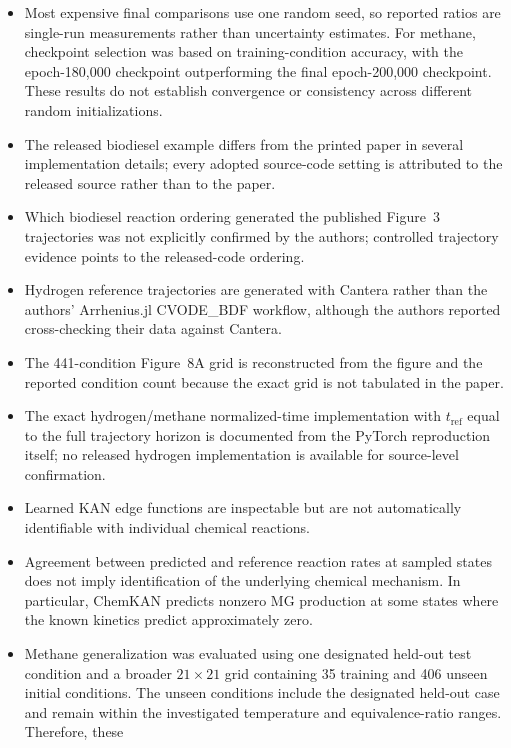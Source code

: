 \documentclass[11pt,a4paper]{article}
\begin{document}
\begin{itemize}
    \item Most expensive final comparisons use one random seed, so reported ratios are single-run measurements rather than uncertainty estimates. For methane, checkpoint selection was based on training-condition accuracy, with the epoch-180,000 checkpoint outperforming the final epoch-200,000 checkpoint. These results do not establish convergence or consistency across different random initializations.
    \item The released biodiesel example differs from the printed paper in several implementation details; every adopted source-code setting is attributed to the released source rather than to the paper.
    \item Which biodiesel reaction ordering generated the published Figure~3 trajectories was not explicitly confirmed by the authors; controlled trajectory evidence points to the released-code ordering.
    \item Hydrogen reference trajectories are generated with Cantera rather than the authors' Arrhenius.jl CVODE\_BDF workflow, although the authors reported cross-checking their data against Cantera.
    \item The 441-condition Figure~8A grid is reconstructed from the figure and the reported condition count because the exact grid is not tabulated in the paper.
    \item The exact hydrogen/methane normalized-time implementation with $t_{\mathrm{ref}}$ equal to the full trajectory horizon is documented from the PyTorch reproduction itself; no released hydrogen implementation is available for source-level confirmation.
    \item Learned KAN edge functions are inspectable but are not automatically identifiable with individual chemical reactions.
    \item Agreement between predicted and reference
    reaction rates at sampled states does not imply
    identification of the underlying chemical
    mechanism. In particular, ChemKAN predicts nonzero MG production at some states where the known kinetics predict approximately zero.
    \item Methane generalization was evaluated using
    one designated held-out test condition and a
    broader $21\times21$ grid containing 35 training
    and 406 unseen initial conditions. The unseen
    conditions include the designated held-out case
    and remain within the investigated temperature
    and equivalence-ratio ranges. Therefore, these

\end{itemize}
\end{document}

